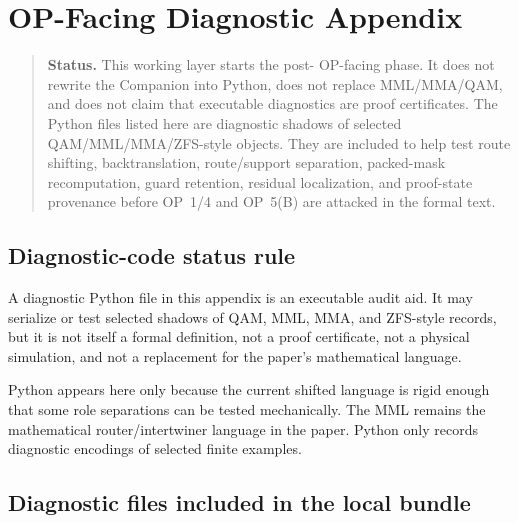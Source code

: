 \section{OP-Facing Diagnostic Appendix}
\label{sec:v410r01-op-facing-diagnostic-appendix}

\begin{quote}\small
\noindent\textbf{Status.}
This working layer starts the post- OP-facing phase. It does not
rewrite the Companion into Python, does not replace MML/MMA/QAM, and does not
claim that executable diagnostics are proof certificates. The Python files
listed here are diagnostic shadows of selected QAM/MML/MMA/ZFS-style objects.
They are included to help test route shifting, backtranslation, route/support
separation, packed-mask recomputation, guard retention, residual localization,
and proof-state provenance before OP~1/4 and OP~5(B) are attacked in the
formal text.
\end{quote}

\subsection{Diagnostic-code status rule}
\label{subsec:v410r01-diagnostic-code-status-rule}

\begin{definition}
\label{def:v410r01-diagnostic-code-status-rule}
A diagnostic Python file in this appendix is an executable audit aid. It may
serialize or test selected shadows of QAM, MML, MMA, and ZFS-style records, but
it is not itself a formal definition, not a proof certificate, not a physical
simulation, and not a replacement for the paper's mathematical language.
\end{definition}

\begin{remark}
\label{rem:v410r01-why-python-only-appendix}
Python appears here only because the current shifted language is rigid enough that
some role separations can be tested mechanically. The MML remains the
mathematical router/intertwiner language in the paper. Python only records
diagnostic encodings of selected finite examples.
\end{remark}

\subsection{Diagnostic files included in the local bundle}
\label{subsec:v410r01-diagnostic-files-included}

